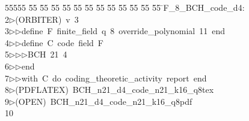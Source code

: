 %
%
\begin{tabbing}
55555 \= 55 \= 55 \= 55 \= 55 \= 55 \= 55 \= 55 \= 55 \= 55 \= 55 \= 55 \= 55 \= \>F\_8\_BCH\_code\_d4:\\[0pt]
2\>$\triangleright$\>(ORBITER)\ v\ 3\ \\[0pt]
3\>$\triangleright$\>$\triangleright$\>define\ F\ finite\_field\ q\ 8\ override\_polynomial\ 11\ end\ \\[0pt]
4\>$\triangleright$\>$\triangleright$\>define\ C\ code\ field\ F\ \\[0pt]
5\>$\triangleright$\>$\triangleright$\>$\triangleright$\>BCH\ 21\ 4\ \\[0pt]
6\>$\triangleright$\>$\triangleright$\>end\ \\[0pt]
7\>$\triangleright$\>$\triangleright$\>with\ C\ do\ coding\_theoretic\_activity\ report\ end\\[0pt]
8\>$\triangleright$\>(PDFLATEX)\ BCH\_n21\_d4\_code\_n21\_k16\_q8tex\\[0pt]
9\>$\triangleright$\>(OPEN)\ BCH\_n21\_d4\_code\_n21\_k16\_q8pdf\\[0pt]
10\>\end{tabbing}
